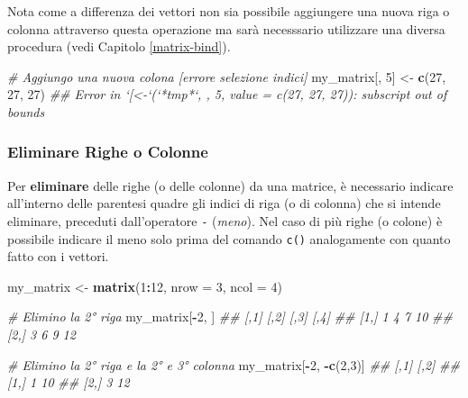 \documentclass[
]{book}
\newenvironment{Shaded}{\begin{snugshade}}{\end{snugshade}}
\newcommand{\CommentTok}[1]{\textcolor[rgb]{0.56,0.35,0.01}{\textit{#1}}}
\newcommand{\DataTypeTok}[1]{\textcolor[rgb]{0.13,0.29,0.53}{#1}}
\newcommand{\DecValTok}[1]{\textcolor[rgb]{0.00,0.00,0.81}{#1}}
\newcommand{\KeywordTok}[1]{\textcolor[rgb]{0.13,0.29,0.53}{\textbf{#1}}}
\newcommand{\NormalTok}[1]{#1}
\newcommand{\OperatorTok}[1]{\textcolor[rgb]{0.81,0.36,0.00}{\textbf{#1}}}
\newcommand{\StringTok}[1]{\textcolor[rgb]{0.31,0.60,0.02}{#1}}
\begin{document}
Nota come a differenza dei vettori non sia possibile aggiungere una nuova riga o colonna attraverso questa operazione ma sarà necesssario utilizzare una diversa procedura (vedi Capitolo \ref{matrix-bind}).

\begin{Shaded}
\begin{Highlighting}[]
\CommentTok{# Aggiungo una nuova colona [errore selezione indici]}
\NormalTok{my_matrix[, }\DecValTok{5}\NormalTok{] <-}\StringTok{ }\KeywordTok{c}\NormalTok{(}\DecValTok{27}\NormalTok{, }\DecValTok{27}\NormalTok{, }\DecValTok{27}\NormalTok{)}
\CommentTok{## Error in `[<-`(`*tmp*`, , 5, value = c(27, 27, 27)): subscript out of bounds}
\end{Highlighting}
\end{Shaded}

\hypertarget{eliminare-righe-o-colonne}{%
\subsubsection*{Eliminare Righe o Colonne}\label{eliminare-righe-o-colonne}}

Per \textbf{eliminare} delle righe (o delle colonne) da una matrice, è necessario indicare all'interno delle parentesi quadre gli indici di riga (o di colonna) che si intende eliminare, preceduti dall'operatore \texttt{-} (\emph{meno}). Nel caso di più righe (o colone) è possibile indicare il meno solo prima del comando \texttt{c()} analogamente con quanto fatto con i vettori.

\begin{Shaded}
\begin{Highlighting}[]
\NormalTok{my_matrix <-}\StringTok{ }\KeywordTok{matrix}\NormalTok{(}\DecValTok{1}\OperatorTok{:}\DecValTok{12}\NormalTok{, }\DataTypeTok{nrow =} \DecValTok{3}\NormalTok{, }\DataTypeTok{ncol =} \DecValTok{4}\NormalTok{)}

\CommentTok{# Elimino la 2° riga}
\NormalTok{my_matrix[}\OperatorTok{-}\DecValTok{2}\NormalTok{, ]}
\CommentTok{##      [,1] [,2] [,3] [,4]}
\CommentTok{## [1,]    1    4    7   10}
\CommentTok{## [2,]    3    6    9   12}

\CommentTok{# Elimino la 2° riga  e la 2° e 3° colonna}
\NormalTok{my_matrix[}\OperatorTok{-}\DecValTok{2}\NormalTok{, }\OperatorTok{-}\KeywordTok{c}\NormalTok{(}\DecValTok{2}\NormalTok{,}\DecValTok{3}\NormalTok{)]}
\CommentTok{##      [,1] [,2]}
\CommentTok{## [1,]    1   10}
\CommentTok{## [2,]    3   12}
\end{Highlighting}
\end{Shaded}
\end{document}
